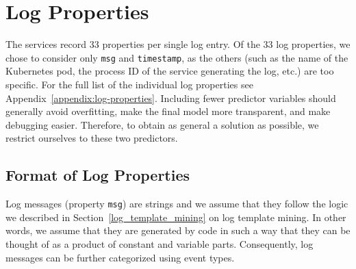 \begin{table}[!h]
\centering
{}
\caption{Summary of all the log datasets we worked with in our research on anomaly detection.}
\label{table:datasets}
\end{table}

\section{Log Properties}
The services record 33 properties per single log entry. Of the 33 log properties, we chose to consider only \texttt{msg} and \texttt{timestamp}, as the others (such as the name of the Kubernetes pod, the process ID of the service generating the log, etc.) are too specific. For the full list of the individual log properties see Appendix~\ref{appendix:log-properties}.
Including fewer predictor variables should generally avoid overfitting, make the final model more transparent, and make debugging easier.
Therefore, to obtain as general a solution as possible, we restrict ourselves to these two predictors.

\subsection{Format of Log Properties}
Log messages (property \texttt{msg}) are strings and we assume that they follow the logic we described in Section~\ref{log_template_mining} on log template mining. In other words, we assume that they are generated by code in such a way that they can be thought of as a product of constant and variable parts. Consequently, log messages can be further categorized using event types.

